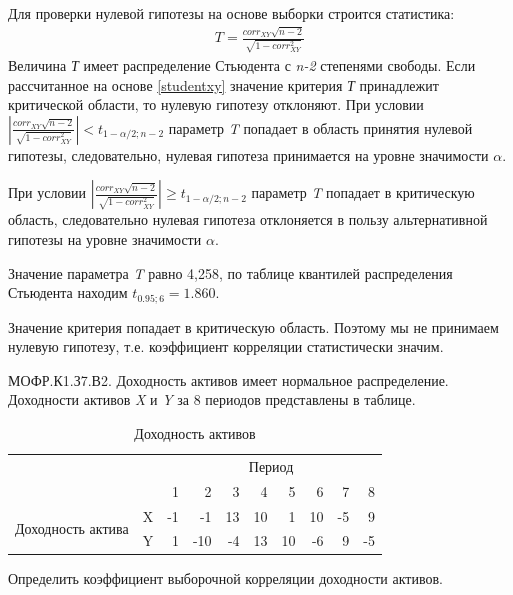 \documentclass[12pt, table, a4paper,twoside]{exam}
\begin{document}
\begin{questions}
\begin{subparts}
\begin{solution}[4em]
	Для проверки нулевой гипотезы на основе выборки строится статистика:
	\begin{align}
	\label{studentxy}
	T=\frac{corr_{XY}\sqrt{n-2}}{\sqrt{1-corr_{XY}^2}}
	\end{align}
	Величина \textit{Т} имеет распределение Стьюдента с \textit{n-2} степенями свободы. Если рассчитанное на основе \eqref{studentxy} значение критерия \textit{Т }принадлежит критической области, то нулевую гипотезу отклоняют. 
	При условии $\left|\frac{corr_{XY}\sqrt{n-2}}{\sqrt{1-corr_{XY}^2}}\right|<t_{1-\alpha/2;n-2}$ параметр \textit{T} попадает в область принятия нулевой гипотезы, следовательно, нулевая гипотеза принимается на уровне значимости $\alpha$.
	
	При условии $\left|\frac{corr_{XY}\sqrt{n-2}}{\sqrt{1-corr_{XY}^2}}\right|\geq t_{1-\alpha/2;n-2}$ параметр \textit{T} попадает в критическую область, следовательно нулевая гипотеза отклоняется в пользу альтернативной гипотезы на уровне значимости $\alpha$.
	
	Значение параметра \textit{T} равно 4,258, по таблице квантилей распределения Стьюдента находим $t_{0.95;6}=1.860$.
	
	Значение критерия попадает в критическую область. Поэтому мы не принимаем нулевую гипотезу, т.е. коэффициент корреляции статистически значим.

	\end{solution}
	
\end{subparts}
\addpoints

\question[20] МОФР.К1.З7.В2. Доходность активов имеет нормальное распределение. Доходности активов \textit{X} и \textit{Y} за 8 периодов представлены в таблице.
\begin{table}[H]
	\centering
	\caption{Доходность активов}
	\begin{tabular}{lcrrrrrrrr}
		\toprule
		\multicolumn{2}{c}{\multirow{2}[1]{*}{}} & \multicolumn{8}{c}{Период} \\ \cmidrule{3-10}
		\multicolumn{2}{c}{} & 1 & 2 & 3 & 4 & 5 & 6 & 7 & 8 \\
		\midrule
		
		\multicolumn{1}{l}{\multirow{2}[1]{*}{Доходность актива}} & X     & -1    & -1    & 13    & 10    & 1     & 10    & -5    & 9 \\
		& Y     & 1     & -10   & -4    & 13    & 10    & -6    & 9     & -5 \\
		\bottomrule
	\end{tabular}%
	\label{tab:addlabel}%
\end{table}%
\noaddpoints
\begin{subparts}
	\subpart[10] Определить коэффициент выборочной корреляции доходности активов.
	

\end{subparts}
\end{questions}
\end{document}
